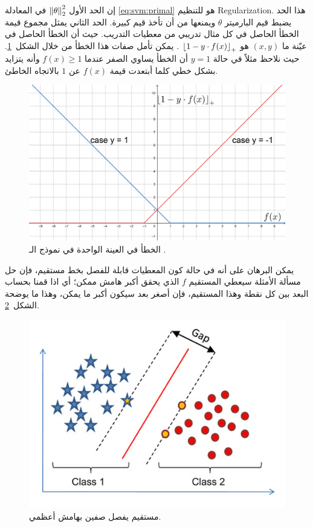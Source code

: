 إن الحد الأول $ \left\lVert\theta\right\rVert_{2}^2 $ في المعادلة \ref{eq:svm:primal} هو للتنظيم \textenglish{Regularization}.
هذا الحد يضبط قيم البارميتر $ \theta $ ويمنعها من أن تأخذ قيم كبيرة.
الحد الثاني يمثل مجموع قيمة الخطأ الحاصل في كل مثال تدريبي من معطيات التدريب.
حيث أن الخطأ الحاصل في عيّنة ما $ (x, y) $ هو
 $ \left\lfloor1 - y \cdot f(x)\right\rfloor_{+} $%
. يمكن تأمل صفات هذا الخطأ من خلال الشكل~\ref{fig:svm:error}.
حيث نلاحظ مثلاً في حالة $ y = 1 $ أن الخطأ يساوي الصفر عندما $ f(x) \geq 1 $ 
وأنه يتزايد بشكل خطي كلما أبتعدت قيمة $ f(x) $ عن $1$ بالاتجاه الخاطئ.
 \begin{figure}[htb] 
 	\centering
 	\includegraphics[width=0.7\linewidth]{images/svm-error.png}
 	\caption{%
 		الخطأ في العينة الواحدة في نموذج الـ .
 	}
 	\label{fig:svm:error}
 \end{figure}

يمكن البرهان على أنه في حالة كون المعطيات قابلة للفصل بخط مستقيم، فإن حل مسألة الأمثلة سيعطي المستقيم $f$ الذي يحقق أكبر هامش ممكن؛
أي اذا قمنا بحساب البعد بين كل نقطة وهذا المستقيم، فإن أصغر بعد سيكون أكبر ما يمكن، وهذا ما يوضحة الشكل~\ref{fig:svm:margin}.
 \begin{figure}[htb]
	\centering
	\includegraphics[width=0.5\linewidth]{images/svm-margin.jpg}
	\caption{
		مستقيم يفصل صفين بهامش أعظمي.
	}
	\label{fig:svm:margin}
\end{figure}


